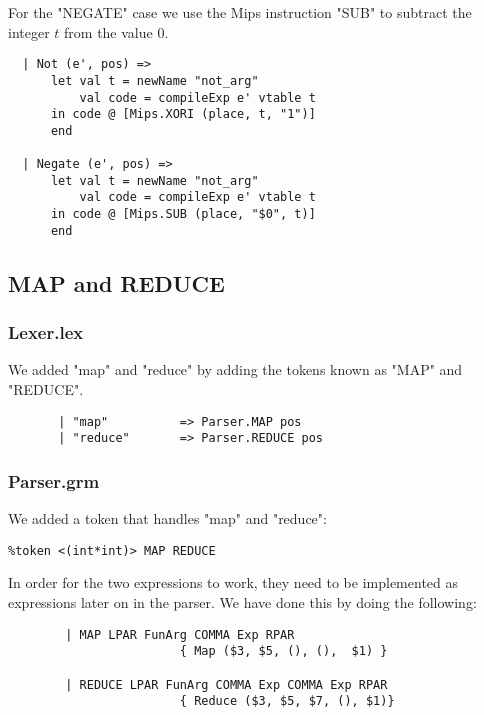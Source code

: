 \documentclass[12pt]{article}
\begin{document}
For the "NEGATE" case we use the Mips instruction "SUB" to subtract the integer \(t\) from the value 0. 
\begin{verbatim}
  | Not (e', pos) =>
      let val t = newName "not_arg"
          val code = compileExp e' vtable t
      in code @ [Mips.XORI (place, t, "1")]
      end
      
  | Negate (e', pos) =>
      let val t = newName "not_arg"
          val code = compileExp e' vtable t
      in code @ [Mips.SUB (place, "$0", t)]
      end
\end{verbatim}

\subsection{MAP and REDUCE}
\subsubsection{Lexer.lex}
We added "map" and "reduce" by adding the tokens known as "MAP" and "REDUCE".
\begin{verbatim}
       | "map"          => Parser.MAP pos
       | "reduce"       => Parser.REDUCE pos
\end{verbatim}
\subsubsection{Parser.grm}
We added a token that handles "map" and "reduce":
\begin{verbatim}
%token <(int*int)> MAP REDUCE
\end{verbatim}
In order for the two expressions to work, they need to be implemented as expressions later on in the parser. We have done this by doing the following:
\begin{verbatim}
        | MAP LPAR FunArg COMMA Exp RPAR
                        { Map ($3, $5, (), (),  $1) }

        | REDUCE LPAR FunArg COMMA Exp COMMA Exp RPAR
                        { Reduce ($3, $5, $7, (), $1)}
\end{verbatim}
\end{document}
